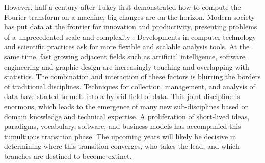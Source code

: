 However, half a century after Tukey first demonstrated how to compute the Fourier transform on a machine, big changes are on the horizon. 
Modern society has put data at the frontier for innovation and productivity, presenting problems of a unprecedented scale and complexity \citep{manyika2011big}.
Developments in computer technology and scientific practices ask for more flexible and scalable analysis tools. 
At the same time, fast growing adjacent fields such as artificial intelligence, software engineering and graphic design are increasingly touching and overlapping with statistics. 
The combination and interaction of these factors is blurring the borders of traditional disciplines. Techniques for collection, management, and analysis of data have started to melt into a hybrid field of data. This joint discipline is enormous, which leads to the emergence of many new sub-disciplines based on domain knowledge and technical expertise.
A proliferation of short-lived ideas, paradigms, vocabulary, software, and business models has accompanied this tumultuous transition phase. The upcoming years will likely be decisive in determining where this transition converges, who takes the lead, and which branches are destined to become extinct.


